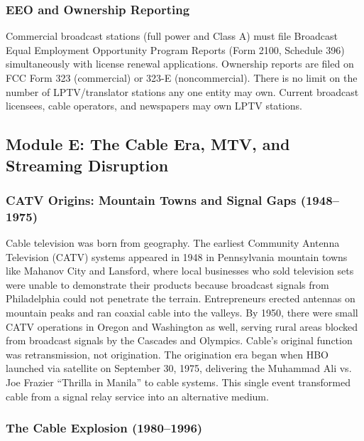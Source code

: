 \documentclass[11pt,letterpaper]{article}
\begin{document}
\subsubsection{EEO and Ownership Reporting}

Commercial broadcast stations (full power and Class A) must file Broadcast Equal Employment Opportunity Program Reports (Form 2100, Schedule 396) simultaneously with license renewal applications. Ownership reports are filed on FCC Form 323 (commercial) or 323-E (noncommercial). There is no limit on the number of LPTV/translator stations any one entity may own. Current broadcast licensees, cable operators, and newspapers may own LPTV stations.

\subsection{Module E: The Cable Era, MTV, and Streaming Disruption}

\subsubsection{CATV Origins: Mountain Towns and Signal Gaps (1948--1975)}

Cable television was born from geography. The earliest Community Antenna Television (CATV) systems appeared in 1948 in Pennsylvania mountain towns like Mahanov City and Lansford, where local businesses who sold television sets were unable to demonstrate their products because broadcast signals from Philadelphia could not penetrate the terrain. Entrepreneurs erected antennas on mountain peaks and ran coaxial cable into the valleys. By 1950, there were small CATV operations in Oregon and Washington as well, serving rural areas blocked from broadcast signals by the Cascades and Olympics. Cable's original function was retransmission, not origination. The origination era began when HBO launched via satellite on September 30, 1975, delivering the Muhammad Ali vs. Joe Frazier ``Thrilla in Manila'' to cable systems. This single event transformed cable from a signal relay service into an alternative medium.

\subsubsection{The Cable Explosion (1980--1996)}
\end{document}
